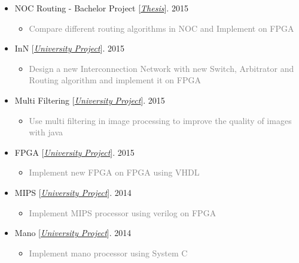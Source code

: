 \documentclass[10pt,a4paper,sans]{moderncv} %
\begin{document}
\begin{itemize}
		\item NOC Routing - Bachelor Project [\href{https://sbu.ac.ir/Cols/CSE/Pages/default.aspx/}{\emph{Thesis}}]. \hfill 2015
		\begin{itemize}
			\item \textcolor{gray} {Compare different routing algorithms in NOC and Implement on FPGA}
		\end{itemize}

		\item InN [\href{https://sbu.ac.ir/Cols/CSE/Pages/default.aspx/}{\emph{University Project}}]. \hfill 2015
		\begin{itemize}
			\item \textcolor{gray} {Design a new Interconnection Network with new Switch, Arbitrator and Routing algorithm and implement it on FPGA}
		\end{itemize}

		\item Multi Filtering [\href{https://sbu.ac.ir/Cols/CSE/Pages/default.aspx/}{\emph{University Project}}]. \hfill 2015
		\begin{itemize}
			\item \textcolor{gray} {Use multi filtering in image processing to improve the quality of images with java}
		\end{itemize}

		\item FPGA [\href{https://sbu.ac.ir/Cols/CSE/Pages/default.aspx/}{\emph{University Project}}]. \hfill 2015
		\begin{itemize}
			\item \textcolor{gray} {Implement new FPGA on FPGA using VHDL}
		\end{itemize}

		\item MIPS [\href{https://sbu.ac.ir/Cols/CSE/Pages/default.aspx/}{\emph{University Project}}]. \hfill 2014
		\begin{itemize}
			\item \textcolor{gray} {Implement MIPS processor using verilog on FPGA}
		\end{itemize}

		\item Mano [\href{https://sbu.ac.ir/Cols/CSE/Pages/default.aspx/}{\emph{University Project}}]. \hfill 2014
		\begin{itemize}
			\item \textcolor{gray} {Implement mano processor using System C}
		\end{itemize}


\end{itemize}
\end{document}
